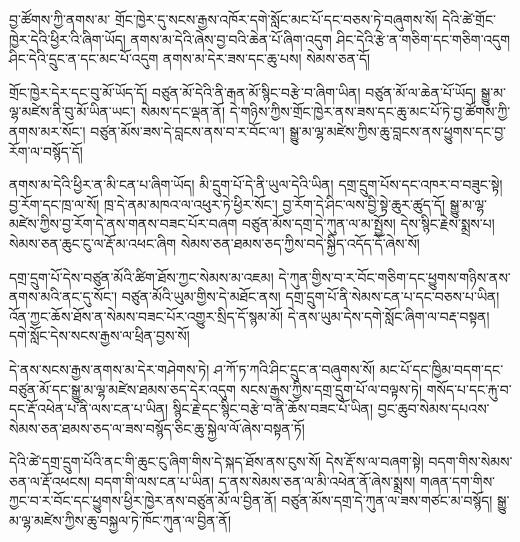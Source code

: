 \documentclass[12pt]{nextbook}
\begin{document}
\begin{readersection}{བྱ་ཚོགས་ཀྱི་ནགས་མ་}
གྲོང་ཁྱེར་དུ་སངས་རྒྱས་འཁོར་དགེ་སློང་མང་པོ་དང་བཅས་ཏེ་བཞུགས་སོ། དེའི་ཚེ་གྲོང་ཁྱེར་དེའི་ཕྱིར་འི་ཞིག་ཡོད། ནགས་མ་དེའི་ཞེས་བྱ་བའི་ཆེན་པོ་ཞིག་འདུག ཤིང་དེའི་རྩེ་ན་གཅིག་དང་གཅིག་འདུག ཤིང་དེའི་དྲུང་ན་དང་མང་པོ་འདུག ནགས་མ་དེར་ཟས་དང་ཆུ་པས། སེམས་ཅན་དོ།

གྲོང་ཁྱེར་དེར་དང་བུ་མོ་ཡོད་དོ། བཙུན་མོ་དེའི་ནི་རྒན་མོ་སྙིང་བརྩེ་བ་ཞིག་ཡིན། བཙུན་མོ་ལ་ཆེན་པོ་ཡོད། སྒྱུ་མ་ལྷ་མཛེས་ནི་བུ་མོ་ཡིན་ཡང་། སེམས་དང་ལྡན་ནོ། དེ་གཉིས་ཀྱིས་གྲོང་ཁྱེར་ནས་ཟས་དང་ཆུ་མང་པོ་ཏེ་བྱ་ཚོགས་ཀྱི་ནགས་མར་སོང་། བཙུན་མོས་ཟས་དེ་བླངས་ནས་བ་ར་བོང་ལ་། སྒྱུ་མ་ལྷ་མཛེས་ཀྱིས་ཆུ་བླངས་ནས་ཕྱུགས་དང་བྱ་རོག་ལ་བསྙོད་དོ།

ནགས་མ་དེའི་ཕྱིར་ན་མི་ངན་པ་ཞིག་ཡོད། མི་དྲུག་པོ་དེ་ནི་ཡུལ་དེའི་ཡིན། དགྲ་དྲུག་པོས་དང་འཁར་བ་བཟུང་སྟེ། བྱ་རོག་དང་ཁྲ་ལ་སོ། ཁྲ་དེ་ནམ་མཁའ་ལ་འཕུར་ཏེ་ཕྱིར་སོང་། བྱ་རོག་དེ་ཤིང་ལས་བྱི་སྟེ་ཆུར་ཚུད་དོ། སྒྱུ་མ་ལྷ་མཛེས་ཀྱིས་བྱ་རོག་དེ་ནས་གནས་བཟང་པོར་བཞག བཙུན་མོས་དགྲ་དེ་ཀུན་ལ་མ་སྤྱོས། དེས་སྙིང་རྗེས་སྨྲས་པ། སེམས་ཅན་ཆུང་ངུ་ལ་རྡོ་མ་འཕང་ཞིག སེམས་ཅན་ཐམས་ཅད་ཀྱིས་བདེ་སྐྱིད་འདོད་དོ་ཞེས་སོ།

དགྲ་དྲུག་པོ་དེས་བཙུན་མོའི་ཚིག་ཐོས་ཀྱང་སེམས་མ་འཇམ། དེ་ཀུན་གྱིས་བ་ར་བོང་གཅིག་དང་ཕྱུགས་གཉིས་ནས་ནགས་མའི་ནང་དུ་སོང་། བཙུན་མོའི་ཡུམ་གྱིས་དེ་མཐོང་ནས། དགྲ་དྲུག་པོ་ནི་སེམས་ངན་པ་དང་བཅས་པ་ཡིན། འོན་ཀྱང་ཆོས་ཐོས་ན་སེམས་བཟང་པོར་འགྱུར་སྲིད་དོ་སྙམ་མོ། དེ་ནས་ཡུམ་དེས་དགེ་སློང་ཞིག་ལ་བརྡ་བསྟན། དགེ་སློང་དེས་སངས་རྒྱས་ལ་ཕྲིན་བྱས་སོ།

དེ་ནས་སངས་རྒྱས་ནགས་མ་དེར་གཤེགས་ཏེ། ཤ་ཀོ་ཏ་ཀའི་ཤིང་དྲུང་ན་བཞུགས་སོ། མང་པོ་དང་ཁྱིམ་བདག་དང་བཙུན་མོ་དང་སྒྱུ་མ་ལྷ་མཛེས་ཐམས་ཅད་དེར་འདུག སངས་རྒྱས་ཀྱིས་དགྲ་དྲུག་པོ་ལ་བལྟས་ཏེ། གསོད་པ་དང་རྐུ་བ་དང་རྡོ་འཕེན་པ་ནི་ལས་ངན་པ་ཡིན། སྙིང་རྗེ་དང་སྙིང་བརྩེ་བ་ནི་ཆོས་བཟང་པོ་ཡིན། བྱང་ཆུབ་སེམས་དཔའས་སེམས་ཅན་ཐམས་ཅད་ལ་ཟས་བསྙོད་ཅིང་ཆུ་སྐྱེལ་ལོ་ཞེས་བསྟན་ཏོ།

དེའི་ཚེ་དགྲ་དྲུག་པོའི་ནང་གི་ཆུང་ངུ་ཞིག་གིས་དེ་སྐད་ཐོས་ནས་ངུས་སོ། དེས་རྡོ་ས་ལ་བཞག་སྟེ། བདག་གིས་སེམས་ཅན་ལ་རྡོ་འཕངས། བདག་གི་ལས་ངན་པ་ཡིན། ད་ནས་སེམས་ཅན་ལ་མི་འཕེན་ནོ་ཞེས་སྨྲས། གཞན་དག་གིས་ཀྱང་བ་ར་བོང་དང་ཕྱུགས་ཕྱིར་ཁྱེར་ནས་བཙུན་མོ་ལ་བྱིན་ནོ། བཙུན་མོས་དགྲ་དེ་ཀུན་ལ་ཟས་གཙང་མ་བསྙོད། སྒྱུ་མ་ལྷ་མཛེས་ཀྱིས་ཆུ་བསྐྱལ་ཏེ་ཁོང་ཀུན་ལ་བྱིན་ནོ།


\end{readersection}
\end{document}
